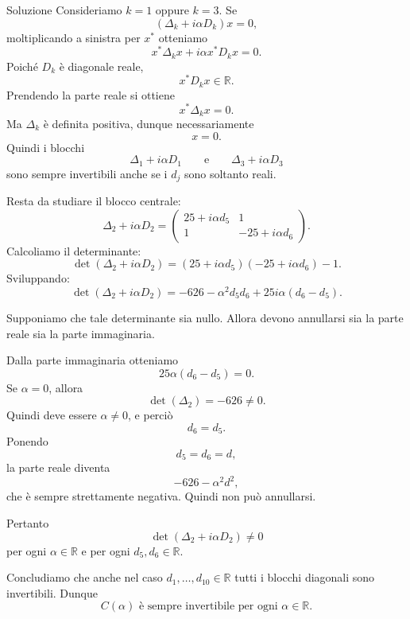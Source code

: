 \documentclass[a4paper]{article}
\begin{document}
\begin{snippetsolution}{Soluzione}
    Consideriamo \(k=1\) oppure \(k=3\). Se
    \[
        (\Delta_k+i\alpha D_k)x=0,
    \]
    moltiplicando a sinistra per \(x^*\) otteniamo
    \[
        x^*\Delta_kx+i\alpha x^*D_kx=0.
    \]
    Poiché \(D_k\) è diagonale reale,
    \[
        x^*D_kx\in\mathbb{R}.
    \]
    Prendendo la parte reale si ottiene
    \[
        x^*\Delta_kx=0.
    \]
    Ma \(\Delta_k\) è definita positiva, dunque necessariamente
    \[
        x=0.
    \]
    Quindi i blocchi
    \[
        \Delta_1+i\alpha D_1
        \qquad\text{e}\qquad
        \Delta_3+i\alpha D_3
    \]
    sono sempre invertibili anche se i \(d_j\) sono soltanto reali.

    Resta da studiare il blocco centrale:
    \[
        \Delta_2+i\alpha D_2
        =
        \begin{pmatrix}
            25+i\alpha d_5 & 1\\
            1 & -25+i\alpha d_6
        \end{pmatrix}.
    \]
    Calcoliamo il determinante:
    \[
        \det(\Delta_2+i\alpha D_2)
        =
        (25+i\alpha d_5)(-25+i\alpha d_6)-1.
    \]
    Sviluppando:
    \[
        \det(\Delta_2+i\alpha D_2)
        =
        -626-\alpha^2 d_5d_6+25i\alpha(d_6-d_5).
    \]

    Supponiamo che tale determinante sia nullo. Allora devono annullarsi sia la parte reale sia la parte immaginaria.

    Dalla parte immaginaria otteniamo
    \[
        25\alpha(d_6-d_5)=0.
    \]
    Se \(\alpha=0\), allora
    \[
        \det(\Delta_2)=-626\neq 0.
    \]
    Quindi deve essere \(\alpha\neq 0\), e perciò
    \[
        d_6=d_5.
    \]
    Ponendo
    \[
        d_5=d_6=d,
    \]
    la parte reale diventa
    \[
        -626-\alpha^2 d^2,
    \]
    che è sempre strettamente negativa. Quindi non può annullarsi.

    Pertanto
    \[
        \det(\Delta_2+i\alpha D_2)\neq 0
    \]
    per ogni \(\alpha\in\mathbb{R}\) e per ogni \(d_5,d_6\in\mathbb{R}\).

    Concludiamo che anche nel caso \(d_1,\dots,d_{10}\in\mathbb{R}\) tutti i blocchi diagonali sono invertibili. Dunque
    \[
        C(\alpha) \text{ è sempre invertibile per ogni } \alpha\in\mathbb{R}.
    \]
\end{snippetsolution}
\end{document}
